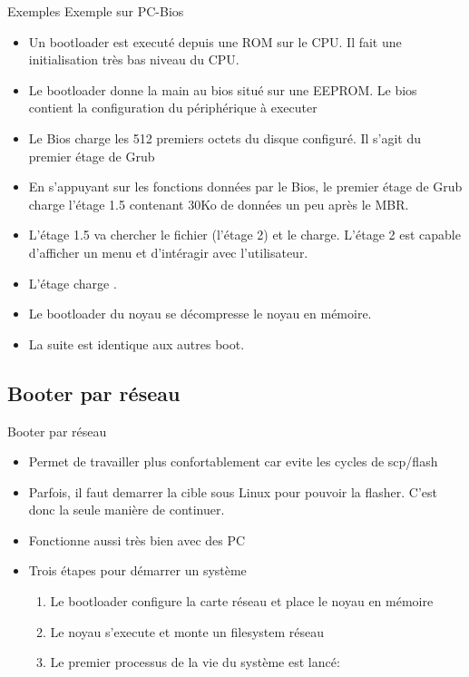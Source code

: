 \begin{frame}[fragile=singleslide]{Exemples} Exemple sur PC-Bios
  \begin{itemize}
  \item Un bootloader  est executé depuis une ROM sur  le CPU. Il fait
    une initialisation très bas niveau du CPU.
  \item Le bootloader  donne la main au bios situé  sur une EEPROM. Le
    bios contient la configuration du périphérique à executer
  \item Le Bios charge les 512 premiers octets du disque configuré. Il
    s'agit du premier étage de Grub
  \item  En s'appuyant  sur  les  fonctions données  par  le Bios,  le
    premier étage de Grub charge l'étage 1.5 contenant 30Ko de données
    un peu après le MBR.
  \item L'étage 1.5 va  chercher le fichier  (l'étage
    2)  et le charge.   L'étage 2  est capable  d'afficher un  menu et
    d'intéragir avec l'utilisateur.
  \item L'étage charge .
  \item Le bootloader du noyau se décompresse le noyau en mémoire.
  \item La suite est identique aux autres boot.
  \end{itemize}
 \end{frame}

\subsection{Booter par réseau}

\begin{frame}{Booter par réseau}
  \begin{itemize}
  \item Permet de travailler  plus confortablement car evite les cycles
    de scp/flash
  \item Parfois, il faut demarrer  la cible sous Linux pour pouvoir la
    flasher.  C'est donc la seule manière de continuer.
  \item Fonctionne aussi très bien avec des PC
  \item Trois étapes pour démarrer un système
    \begin{enumerate}
    \item Le bootloader configure la carte réseau et place le noyau en
      mémoire
    \item Le noyau s'execute et monte un filesystem réseau
    \item Le premier processus de la vie du système est lancé: 
    \end{enumerate}
    \end{itemize}
\end{frame}

